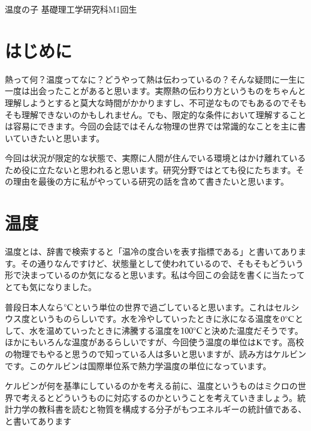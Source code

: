 \documentclass[10pt,b5paper,papersize,dvipdfmx]{jsbook}
\begin{document}


\kaishititle%
  {温度の子}%
  {基礎理工学研究科M1回生}%
  {}%


\section*{はじめに}
熱って何？温度ってなに？どうやって熱は伝わっているの？そんな疑問に一生に一度は出会ったことがあると思います。実際熱の伝わり方というものをちゃんと理解しようとすると莫大な時間がかかりますし、不可逆なものでもあるのでそもそも理解できないのかもしれません。でも、限定的な条件において理解することは容易にできます。今回の会誌ではそんな物理の世界では常識的なことを主に書いていきたいと思います。\par
今回は状況が限定的な状態で、実際に人間が住んでいる環境とはかけ離れているため役に立たないと思われると思います。研究分野ではとても役にたちます。その理由を最後の方に私がやっている研究の話を含めて書きたいと思います。


%
\section{温度}
温度とは、辞書で検索すると「温冷の度合いを表す指標である」と書いてあります。その通りなんですけど、状態量として使われているので、そもそもどういう形で決まっているのか気になると思います。私は今回この会誌を書くに当たってとても気になりました。\par 
普段日本人なら$^\circ \rm{C}$という単位の世界で過ごしていると思います。これはセルシウス度というものらしいです。水を冷やしていったときに氷になる温度を$0 ^\circ \rm{C}$として、水を温めていったときに沸騰する温度を$100 ^\circ \rm{C}$と決めた温度だそうです。ほかにもいろんな温度があるらしいですが、今回使う温度の単位は$\rm{K}$です。高校の物理でもやると思うので知っている人は多いと思いますが、読み方はケルビンです。このケルビンは国際単位系で熱力学温度の単位になっています。\par





ケルビンが何を基準にしているのかを考える前に、温度というものはミクロの世界で考えるとどういうものに対応するのかということを考えていきましょう。統計力学の教科書を読むと物質を構成する分子がもつエネルギーの統計値である、と書いてあります\par
\end{document}

